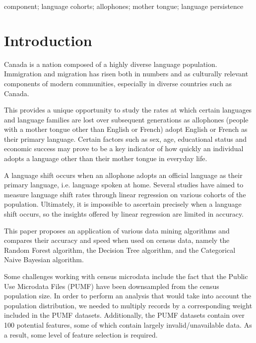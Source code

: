 \documentclass[10pt, conference, compsocconf]{IEEEtran}
\begin{document}
\begin{IEEEkeywords}
component; language cohorts; allophones; mother tongue; language persistence

\end{IEEEkeywords}


%
\IEEEpeerreviewmaketitle



\section{Introduction}
Canada is a nation composed of a highly diverse language population. Immigration and migration has risen both in numbers and as culturally relevant components of modern communities, especially in diverse countries such as Canada.

This provides a unique opportunity to study the rates at which certain languages and language families are lost over subsequent generations as allophones (people with a mother tongue other than English or French) adopt English or French as their primary language. Certain factors such as sex, age, educational status and economic success may prove to be a key indicator of how quickly an individual adopts a language other than their mother tongue in everyday life.

A language shift occurs when an allophone adopts an official language as their primary language, i.e. language spoken at home. Several studies have aimed to measure language shift rates through linear regression on various cohorts of the population. Ultimately, it is impossible to ascertain precisely when a language shift occurs, so the insights offered by linear regression are limited in accuracy.

This paper proposes an application of various data mining algorithms and compares their accuracy and speed when used on census data, namely the Random Forest algorithm, the Decision Tree algorithm, and the Categorical Naive Bayesian algorithm.

Some challenges working with census microdata include the fact that the Public Use Microdata Files (PUMF) have been downsampled from the census population size. In order to perform an analysis that would take into account the population distribution, we needed to multiply records by a corresponding weight included in the PUMF datasets. Additionally, the PUMF datasets contain over 100 potential features, some of which contain largely invalid/unavailable data. As a result, some level of feature selection is required.
\end{document}
